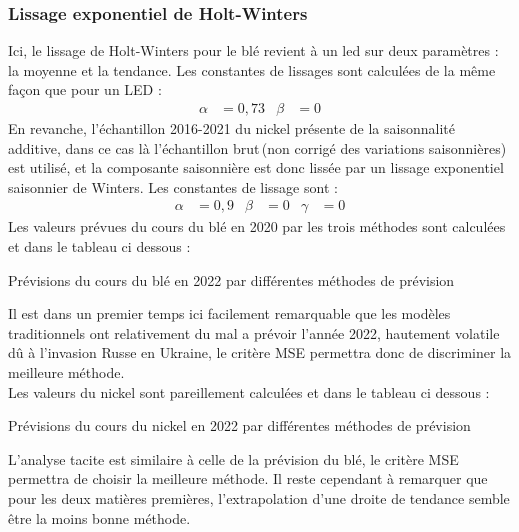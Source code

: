 \subsubsection*{Lissage exponentiel de Holt-Winters}
Ici, le lissage de Holt-Winters pour le blé revient à un led sur deux paramètres : la moyenne et la tendance. Les constantes de lissages sont calculées de la même façon que
pour un LED : 
\begin{align*}
    \alpha &= 0,73 & \beta &= 0
\end{align*}
En revanche, l'échantillon 2016-2021 du nickel présente de la saisonnalité additive, dans ce cas là l'échantillon \guillemotleft brut\guillemotright \,(non corrigé des 
variations saisonnières) est utilisé, et la composante saisonnière est donc lissée par un lissage exponentiel saisonnier de Winters. Les constantes de lissage sont :
\begin{align*}
    \alpha &= 0,9 & \beta &= 0 & \gamma &= 0
\end{align*}
Les valeurs prévues du cours du blé en 2020 par les trois méthodes sont calculées et dans le tableau ci dessous :
\begin{table}[H]
    \centering
    \caption{Prévisions du cours du blé en 2022 par différentes méthodes de prévision}
    \sffamily
    
\end{table}
Il est dans un premier temps ici facilement remarquable que les modèles traditionnels ont relativement du mal a prévoir l'année 2022, hautement volatile dû à l'invasion 
Russe en Ukraine, le critère MSE permettra donc de discriminer la meilleure méthode. \\[11pt]
Les valeurs du nickel sont pareillement calculées et dans le tableau ci dessous :
\begin{table}[H]
    \centering
    \caption{Prévisions du cours du nickel en 2022 par différentes méthodes de prévision}
    \sffamily
    
\end{table}
L'analyse tacite est similaire à celle de la prévision du blé, le critère MSE permettra de choisir la meilleure méthode. Il reste cependant à remarquer que pour les deux 
matières premières, l'extrapolation d'une droite de tendance semble être la moins bonne méthode.
